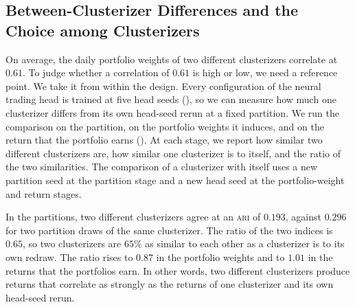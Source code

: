 \subsection{Between-Clusterizer Differences and the Choice among Clusterizers}
\label{sec:gradient}

On average, the daily portfolio weights of two different clusterizers correlate at $0.61$. To judge whether a correlation of $0.61$ is high or low, we need a reference point. We take it from within the design. Every
configuration of the neural trading head is trained at five head seeds (), so we can
measure how much one clusterizer differs from its own head-seed rerun at a fixed partition. We run the comparison on the partition, on the portfolio weights it induces, and on the return that the portfolio earns (). At each stage, we report how similar two different
clusterizers are, how similar one clusterizer is to itself, and the ratio of the two similarities. The comparison of a clusterizer with itself uses a new partition seed at the partition stage and a new head seed at the portfolio-weight and return stages.

In the partitions, two different clusterizers agree at an \textsc{ari} of $0.193$, against $0.296$ for two partition draws of the same clusterizer. The ratio of the two indices is $0.65$, so two clusterizers are $65\%$ as similar to each other as a clusterizer is to its own redraw. The ratio rises to $0.87$ in the portfolio weights and to $1.01$ in the returns that the portfolios earn. In other words, two different clusterizers produce returns that correlate as strongly as the returns of one clusterizer and its own head-seed rerun.

